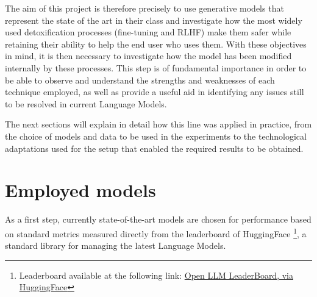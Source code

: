 The aim of this project is therefore precisely to use generative models that represent the state of the art in their class and investigate how the most widely used detoxification processes (fine-tuning and RLHF) make them safer while retaining their ability to help the end user who uses them. With these objectives in mind, it is then necessary to investigate how the model has been modified internally by these processes. This step is of fundamental importance in order to be able to observe and understand the strengths and weaknesses of each technique employed, as well as provide a useful aid in identifying any issues still to be resolved in current Language Models.

The next sections will explain in detail how this line was applied in practice, from the choice of models and data to be used in the experiments to the technological adaptations used for the setup that enabled the required results to be obtained.


\section{Employed models} 
\label{chapter:model-selection}

As a first step, currently state-of-the-art models are chosen for performance based on standard metrics measured directly from the leaderboard of HuggingFace \footnote{Leaderboard available at the following link: \href{https://huggingface.co/spaces/HuggingFaceH4/open_llm_leaderboard}{Open LLM LeaderBoard, via HuggingFace}}, a standard library for managing the latest Language Models.


